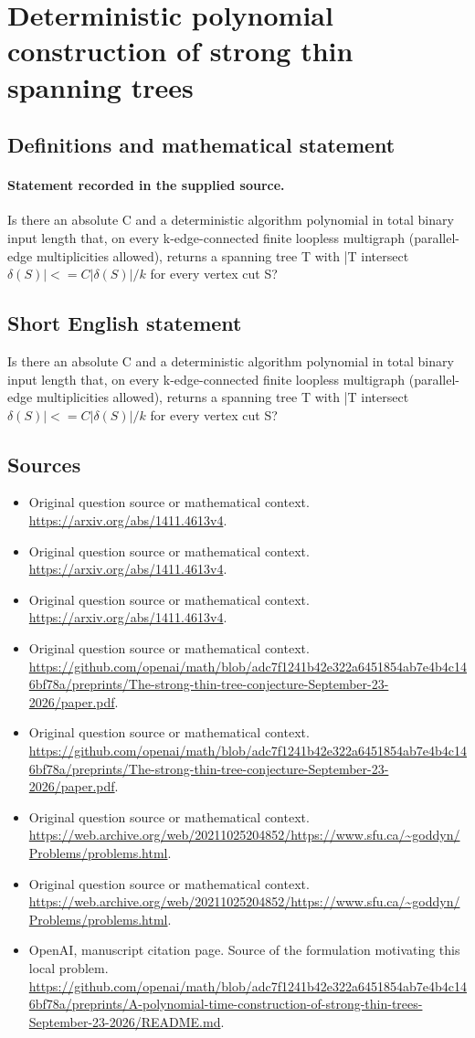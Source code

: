 \documentclass[11pt]{article}
\begin{document}
\section*{Deterministic polynomial construction of strong thin spanning trees}\label{statement}
\subsection{Definitions and mathematical statement}
\paragraph{Statement recorded in the supplied source.}
Is there an absolute C and a deterministic algorithm polynomial in total binary input length that, on every k-edge-connected finite loopless multigraph (parallel-edge multiplicities allowed), returns a spanning tree T with |T intersect $\delta (S)|<=C|\delta (S)|/k$ for every vertex cut S?
\subsection{Short English statement}
Is there an absolute C and a deterministic algorithm polynomial in total binary input length that, on every k-edge-connected finite loopless multigraph (parallel-edge multiplicities allowed), returns a spanning tree T with |T intersect $\delta (S)|<=C|\delta (S)|/k$ for every vertex cut S?
\subsection{Sources}
\begin{itemize}
\item[S1] Original question source or mathematical context.
\url{https://arxiv.org/abs/1411.4613v4}.
\item[S2] Original question source or mathematical context.
\url{https://arxiv.org/abs/1411.4613v4}.
\item[S3] Original question source or mathematical context.
\url{https://arxiv.org/abs/1411.4613v4}.
\item[S4] Original question source or mathematical context.
\url{https://github.com/openai/math/blob/adc7f1241b42e322a6451854ab7e4b4c146bf78a/preprints/The-strong-thin-tree-conjecture-September-23-2026/paper.pdf}.
\item[S5] Original question source or mathematical context.
\url{https://github.com/openai/math/blob/adc7f1241b42e322a6451854ab7e4b4c146bf78a/preprints/The-strong-thin-tree-conjecture-September-23-2026/paper.pdf}.
\item[S6] Original question source or mathematical context.
\url{https://web.archive.org/web/20211025204852/https://www.sfu.ca/~goddyn/Problems/problems.html}.
\item[S7] Original question source or mathematical context.
\url{https://web.archive.org/web/20211025204852/https://www.sfu.ca/~goddyn/Problems/problems.html}.
\item[S8] OpenAI, manuscript citation page. Source of the formulation motivating this local problem.
\url{https://github.com/openai/math/blob/adc7f1241b42e322a6451854ab7e4b4c146bf78a/preprints/A-polynomial-time-construction-of-strong-thin-trees-September-23-2026/README.md}.
\end{itemize}
\end{document}
